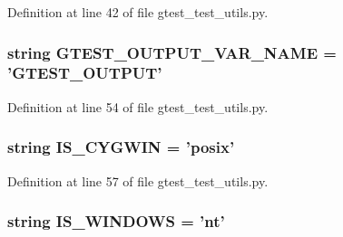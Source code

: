 \-Definition at line 42 of file gtest\-\_\-test\-\_\-utils.\-py.

\hypertarget{namespacegtest__test__utils_a8e9bea8be495f8832f4c6f383537be2d}{
\subsubsection[{\-G\-T\-E\-S\-T\-\_\-\-O\-U\-T\-P\-U\-T\-\_\-\-V\-A\-R\-\_\-\-N\-A\-M\-E}]{\setlength{\rightskip}{0pt plus 5cm}string {\bf \-G\-T\-E\-S\-T\-\_\-\-O\-U\-T\-P\-U\-T\-\_\-\-V\-A\-R\-\_\-\-N\-A\-M\-E} = '\-G\-T\-E\-S\-T\-\_\-\-O\-U\-T\-P\-U\-T'}}\label{d2/d4a/namespacegtest__test__utils_a8e9bea8be495f8832f4c6f383537be2d}


\-Definition at line 54 of file gtest\-\_\-test\-\_\-utils.\-py.

\hypertarget{namespacegtest__test__utils_a090f13f753565f0975ff715f23561d2c}{
\subsubsection[{\-I\-S\-\_\-\-C\-Y\-G\-W\-I\-N}]{\setlength{\rightskip}{0pt plus 5cm}string {\bf \-I\-S\-\_\-\-C\-Y\-G\-W\-I\-N} = 'posix'}}\label{d2/d4a/namespacegtest__test__utils_a090f13f753565f0975ff715f23561d2c}


\-Definition at line 57 of file gtest\-\_\-test\-\_\-utils.\-py.

\hypertarget{namespacegtest__test__utils_ab1b21b880253abfa3ab3dfc19b06814c}{
\subsubsection[{\-I\-S\-\_\-\-W\-I\-N\-D\-O\-W\-S}]{\setlength{\rightskip}{0pt plus 5cm}string {\bf \-I\-S\-\_\-\-W\-I\-N\-D\-O\-W\-S} = 'nt'}}\label{d2/d4a/namespacegtest__test__utils_ab1b21b880253abfa3ab3dfc19b06814c}


